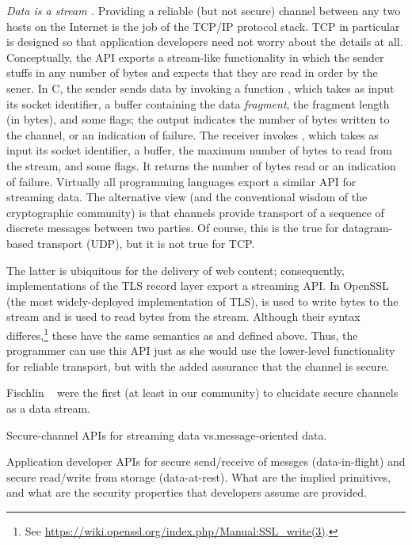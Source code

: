 \emph{Data is a stream \cite{FPMG15}.}
Providing a reliable (but not secure) channel between any two hosts on the Internet
is the job of the TCP/IP protocol stack. TCP in particular is designed so that
application developers need not worry about the details at all.
%
Conceptually, the API exports a stream-like functionality in which the sender
stuffs in any number of bytes and expects that they are read in order by the
sener.
%
In C, the sender sends data by invoking a function , which
takes as input its socket identifier, a buffer containing the data
\emph{fragment}, the fragment length (in bytes), and some flags; the output
indicates the number of bytes written to the channel, or an indication of
failure. The receiver invokes , which takes as input its socket
identifier, a buffer, the maximum number of bytes to read from the stream, and
some flags. It returns the number of bytes read or an indication of failure.
%
Virtually all programming languages export a similar API for streaming data. The
alternative view (and the conventional wisdom of the cryptographic community) is
that channels provide transport of a sequence of discrete messages between two
parties. Of course, this is the true for datagram-based transport (UDP), but it
is not true for TCP.

The latter is ubiquitous for the delivery of web content; consequently,
implementations of the TLS record layer export a streaming API. In OpenSSL (the
most widely-deployed implementation of TLS),  is used to
write bytes to the stream and  is used to read bytes from
the stream. Although their syntax differes,\footnote{ See
\url{https://wiki.openssl.org/index.php/Manual:SSL_write(3)}.} these have the
same semantics as  and  defined above. Thus,
the programmer can use this API just as she would use the lower-level
functionality for reliable transport, but with the added assurance that the
channel is secure.

Fischlin \etal~\cite{FPMG15} were the first (at least in our community) to
elucidate secure channels as a data stream. 

\begin{task}
Secure-channel APIs for streaming data vs.message-oriented data. 
\end{task}

\begin{task}
Application developer APIs for secure send/receive of messges
(data-in-flight) and secure read/write from storage (data-at-rest).  What are
the implied primitives, and what are the security properties that developers
assume are provided.
\end{task}

